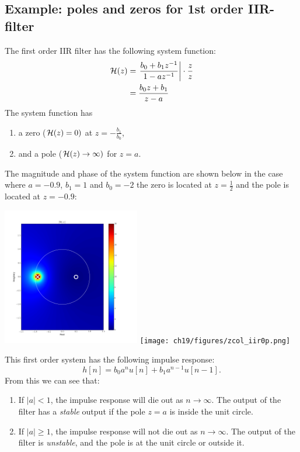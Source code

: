 \subsection{Example: poles and zeros for 1st order IIR-filter}
The first order IIR filter has the following system function:
\begin{align}
\mathcal{H}(z) &= \left.\frac{b_0 + b_1 z^{-1}}{1-a z^{-1}} \right| \cdot \frac{z}{z} \\
     &= \frac{b_0 z + b_1}{z-a}
\end{align}
The system function has
\begin{enumerate}
\item a zero ($\mathcal{H}(z) = 0)$ at $z=-\frac{b_1}{b_0}$,
\item and a pole ($\mathcal{H}(z) \rightarrow \infty)$ for $z=a$.
\end{enumerate}
The magnitude and phase of the system function are shown below in the case where $a=-0.9$, $b_1=1$ and $b_0=-2$ the zero is located at $z = \frac{1}{2}$ and the pole is located at $z=-0.9$:
\begin{center}
\includegraphics[width=0.45\textwidth]{ch19/figures/zcol_iir0.png}
\texttt{[image: ch19/figures/zcol\_iir0p.png]}
\end{center}
This first order system has the following impulse response:
\begin{equation}
h[n] = b_0 a^n u[n] + b_1 a^{n-1} u[n-1].
\end{equation}
From this we can see that:
\begin{enumerate}
\item If $|a|<1$, the impulse response will die out as $n\rightarrow \infty$. The output of the filter has a \emph{stable} output if the pole $z=a$ is inside the unit circle.
\item If $|a|\ge 1$, the impulse response will not die out as $n\rightarrow \infty$. The output of the filter is \emph{unstable}, and the pole is at the unit circle or outside it.
\end{enumerate}
\fi

